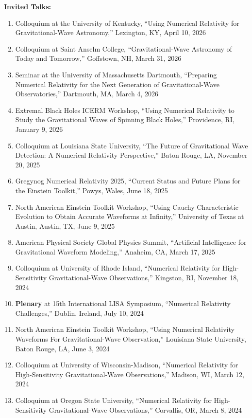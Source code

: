 \documentclass[11pt]{article}
\begin{document}
\begin{flushleft}
\textbf{Invited Talks:}
  \begin{enumerate}
  \item Colloquium at the University of Kentucky, ``Using Numerical Relativity for Gravitational-Wave Astronomy,'' Lexington, KY, April 10, 2026
  \item Colloquium at Saint Anselm College, ``Gravitational-Wave Astronomy of Today and Tomorrow,'' Goffstown, NH, March 31, 2026
  \item Seminar at the University of Massachusetts Dartmouth, ``Preparing Numerical Relativity for the Next Generation of Gravitational-Wave Observatories,'' Dartmouth, MA, March 4, 2026
  \item Extremal Black Holes ICERM Workshop, ``Using Numerical Relativity to Study the Gravitational Waves of Spinning Black Holes,'' Providence, RI, January 9, 2026
  \item Colloquium at Louisiana State University, ``The Future of Gravitational Wave Detection: A Numerical Relativity Perspective,'' Baton Rouge, LA, November 20, 2025
  \item Gregynog Numerical Relativity 2025, ``Current Status and Future Plans for the Einstein Toolkit,'' Powys, Wales, June 18, 2025
  \item North American Einstein Toolkit Workshop, ``Using Cauchy Characteristic Evolution to Obtain Accurate Waveforms at Infinity,'' University of Texas at Austin, Austin, TX, June 9, 2025
  \item American Physical Society Global Physics Summit, ``Artificial Intelligence for Gravitational Waveform Modeling,'' Anaheim, CA, March 17, 2025
  \item Colloquium at University of Rhode Island, ``Numerical Relativity for High-Sensitivity Gravitational-Wave Observations,'' Kingston, RI, November 18, 2024 
  \item \textbf{Plenary} at 15th International LISA Symposium, ``Numerical Relativity Challenges,'' Dublin, Ireland, July 10, 2024
  \item North American Einstein Toolkit Workshop, ``Using Numerical Relativity Waveforms For Gravitational-Wave Observation,'' Louisiana State University, Baton Rouge, LA, June 3, 2024
  \item Colloquium at University of Wisconsin-Madison, ``Numerical Relativity for High-Sensitivity Gravitational-Wave Observations,'' Madison, WI, March 12, 2024 
  \item Colloquium at Oregon State University, ``Numerical Relativity for High-Sensitivity Gravitational-Wave Observations,'' Corvallis, OR, March 8, 2024 

\end{enumerate}
\end{flushleft}
\end{document}
